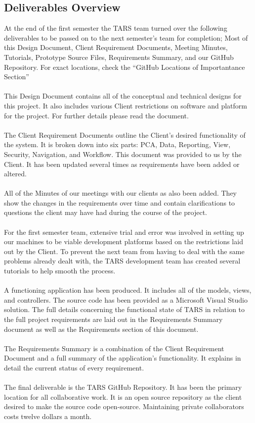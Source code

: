 \documentclass[letterpaper]{article}
\begin{document}
\subsection{Deliverables Overview}
At the end of the first semester the TARS team turned over the following deliverables to be passed on to the next semester's team for completion; Most of this Design Document, Client Requirement Documents, Meeting Minutes, Tutorials, Prototype Source Files, Requirements Summary, and our GitHub Repository. For exact locations, check the ``GitHub Locations of Importantance Section''\\
\\
This Design Document contains all of the conceptual and technical designs for this project.  It also includes various Client restrictions on software and platform for the project.  For further details please read the document.\\
\\
The Client Requirement Documents outline the Client's desired functionality of the system.  It is broken down into six parts: PCA, Data, Reporting, View, Security, Navigation, and Workflow.  This document was provided to us by the Client.  It has been updated several times as requirements have been added or altered.\\
\\
All of the Minutes of our meetings with our clients as also been added.  They show the changes in the requirements over time and contain clarifications to questions the client may have had during the course of the project.\\
\\
For the first semester team, extensive trial and error was involved in setting up our machines to be viable development platforms based on the restrictions laid out by the Client.  To prevent the next team from having to deal with the same problems already dealt with, the TARS development team has created several tutorials to help smooth the process.\\
\\
A functioning application has been produced.  It includes all of the models, views, and controllers.  The source code has been provided as a Microsoft Visual Studio solution.  The full details concerning the functional state of TARS in relation to the full project requirements are laid out in the Requirements Summary document as well as the Requirements section of this document.\\
\\
The Requirements Summary is a combination of the Client Requirement Document and a full summary of the application's functionality.  It explains in detail the current status of every requirement.\\
\\
The final deliverable is the TARS GitHub Repository.  It has been the primary location for all collaborative work.  It is an open source repository as the client desired to make the source code open-source.  Maintaining private collaborators costs twelve dollars a month.\\
\\
\pagebreak
\end{document}
